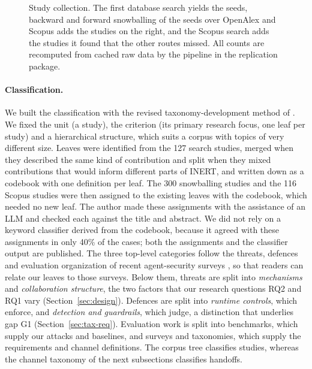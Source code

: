\documentclass[pdflatex,sn-mathphys-num]{sn-jnl}
\theoremstyle{thmstyleone}%
\theoremstyle{thmstyletwo}%
\theoremstyle{thmstylethree}%
\newcommand{\NSearch}{127}
\newcommand{\NSnowManualExcl}{17}
\newcommand{\NSnow}{300}
\newcommand{\NScRuleExcl}{105}
\newcommand{\NScKnown}{58}
\newcommand{\NScopus}{116}
\newcommand{\NScManualExcl}{86}
\newcommand{\NKeywordAgree}{40}
\begin{document}
\begin{figure}[tbp]
\caption{Study collection. The first database search yields the seeds, backward and forward snowballing of the seeds over OpenAlex and Scopus adds the studies on the right, and the Scopus search adds the studies it found that the other routes missed. All counts are recomputed from cached raw data by the pipeline in the replication package.}\label{fig:collection}
\end{figure}

\paragraph{Classification.} We built the classification with the revised taxonomy-development method of \citet{usman2017taxonomies}. We fixed the unit (a study), the criterion (its primary research focus, one leaf per study) and a hierarchical structure, which suits a corpus with topics of very different size. Leaves were identified from the \NSearch{} search studies, merged when they described the same kind of contribution and split when they mixed contributions that would inform different parts of INERT, and written down as a codebook with one definition per leaf. The \NSnow{} snowballing studies and the \NScopus{} Scopus studies were then assigned to the existing leaves with the codebook, which needed no new leaf. The author made these assignments with the assistance of an LLM and checked each against the title and abstract. We did not rely on a keyword classifier derived from the codebook, because it agreed with these assignments in only \NKeywordAgree\% of the cases; both the assignments and the classifier output are published. The three top-level categories follow the threats, defences and evaluation organization of recent agent-security surveys \citep{Yu2025ASOL,Shahriar2025ASOE}, so that readers can relate our leaves to those surveys. Below them, threats are split into \emph{mechanisms} and \emph{collaboration structure}, the two factors that our research questions RQ2 and RQ1 vary (Section~\ref{sec:design}). Defences are split into \emph{runtime controls}, which enforce, and \emph{detection and guardrails}, which judge, a distinction that underlies gap G1 (Section~\ref{sec:tax-req}). Evaluation work is split into benchmarks, which supply our attacks and baselines, and surveys and taxonomies, which supply the requirements and channel definitions. The corpus tree classifies studies, whereas the channel taxonomy of the next subsections classifies handoffs.
\end{document}
